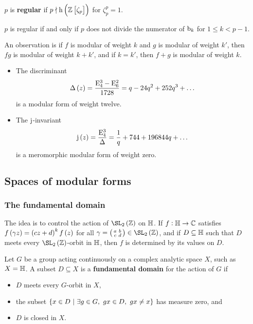 $ p $ is \textbf{regular} if $ p \nmid \h\br{\ZZ\sbr{\zeta_p}} $ for $ \zeta_p^p = 1 $.

\begin{theorem}
$ p $ is regular if and only if $ p $ does not divide the numerator of $ \mathrm{b}_k $ for $ 1 \le k < p - 1 $.
\end{theorem}


An observation is if $ f $ is modular of weight $ k $ and $ g $ is modular of weight $ k' $, then $ fg $ is modular of weight $ k + k' $, and if $ k = k' $, then $ f + g $ is modular of weight $ k $.

\begin{example*}
\hfill
\begin{itemize}
\item The discriminant
$$ \Delta\br{z} = \dfrac{\E_4^3 - \E_6^2}{1728} = q - 24q^2 + 252q^3 + \dots $$
is a modular form of weight twelve.
\item The $ \mathrm{j} $-invariant
$$ \j\br{z} = \dfrac{\E_4^3}{\Delta} = \dfrac{1}{q} + 744 + 196844q + \dots $$
is a meromorphic modular form of weight zero.
\end{itemize}
\end{example*}

\pagebreak

\subsection{Spaces of modular forms}

\subsubsection{The fundamental domain}

The idea is to control the action of $ \SL_2\br{\ZZ} $ on $ \mathbb{H} $. If $ f : \mathbb{H} \to \mathbb{C} $ satisfies $ f\br{\gamma z} = \br{cz + d}^kf\br{z} $ for all $ \gamma = \twobytwosmall{a}{b}{c}{d} \in \SL_2\br{\ZZ} $, and if $ D \subseteq \mathbb{H} $ such that $ D $ meets every $ \SL_2\br{\ZZ} $-orbit in $ \mathbb{H} $, then $ f $ is determined by its values on $ D $.

\begin{definition}
Let $ G $ be a group acting continuously on a complex analytic space $ X $, such as $ X = \mathbb{H} $. A subset $ D \subseteq X $ is a \textbf{fundamental domain} for the action of $ G $ if
\begin{itemize}
\item $ D $ meets every $ G $-orbit in $ X $,
\item the subset $ \cbr{x \in D \st \exists g \in G, \ gx \in D, \ gx \ne x} $ has measure zero, and
\item $ D $ is closed in $ X $.
\end{itemize}
\end{definition}

